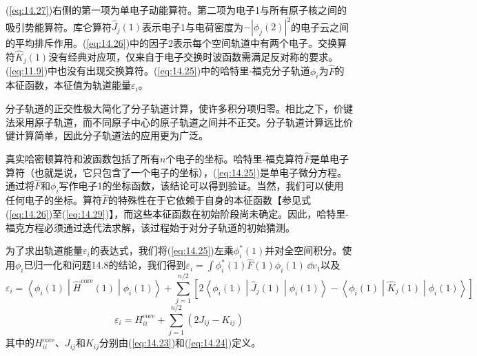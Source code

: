     (\ref{eq:14.27})右侧的第一项为单电子动能算符。第二项为电子1与所有原子核之间的吸引势能算符。库仑算符$\hat{J}_j\left(1\right)$表示电子1与电荷密度为$-\left|\phi_j\left(2\right)\right|^2$的电子云之间的平均排斥作用。(\ref{eq:14.26})中的因子2表示每个空间轨道中有两个电子。交换算符$\hat{K}_j\left(1\right)$没有经典对应项，仅来自于电子交换时波函数需满足反对称的要求。(\ref{eq:11.9})中也没有出现交换算符。(\ref{eq:14.25})中的哈特里-福克分子轨道$\phi_i$为$\hat{F}$的本征函数，本征值为轨道能量$\varepsilon_i$。

    分子轨道的正交性极大简化了分子轨道计算，使许多积分项归零。相比之下，价键法采用原子轨道，而不同原子中心的原子轨道之间并不正交。分子轨道计算远比价键计算简单，因此分子轨道法的应用更为广泛。

    真实哈密顿算符和波函数包括了所有$n$个电子的坐标。哈特里-福克算符$\hat{F}$是单电子算符（也就是说，它只包含了一个电子的坐标），(\ref{eq:14.25})是单电子微分方程。通过将$\hat{F}$和$\phi_i$写作电子1的坐标函数，该结论可以得到验证。当然，我们可以使用任何电子的坐标。算符$\hat{F}$的特殊性在于它依赖于自身的本征函数【参见式(\ref{eq:14.26})至(\ref{eq:14.29})】，而这些本征函数在初始阶段尚未确定。因此，哈特里-福克方程必须通过迭代法求解，该过程始于对分子轨道的初始猜测。

    为了求出轨道能量$\varepsilon_i$的表达式，我们将(\ref{eq:14.25})左乘$\phi_i^*\left(1\right)$并对全空间积分。使用$\phi_i$已归一化和问题14.8的结论，我们得到$\varepsilon_i = \int \phi_i^*\left(1\right) \hat{F}\left(1\right) \phi_i\left(1\right) \:\dd v_1$以及
    \begin{equation*}
        \varepsilon_i = \left\langle \phi_i \left(1\right) \middle| \hat{H}^{\text{core}}\left(1\right) \middle| \phi_i \left(1\right) \right\rangle + \sum_{j=1}^{n/2} \left[2\left\langle \phi_i\left(1\right) \middle| \hat{J}_j\left(1\right) \middle| \phi_i\left(1\right) \right\rangle - \left\langle \phi_i\left(1\right) \middle| \hat{K}_j\left(1\right) \middle| \phi_i\left(1\right) \right\rangle\right]
    \end{equation*}
    \begin{equation}
        \varepsilon_i = H^{\text{core}}_{ii} + \sum_{j=1}^{n/2} \left(2J_{ij} - K_{ij}\right)
        \label{eq:14.30}
    \end{equation}
    其中的$H^{\text{core}}_{ii}$、$J_{ij}$和$K_{ij}$分别由(\ref{eq:14.23})和(\ref{eq:14.24})定义。

